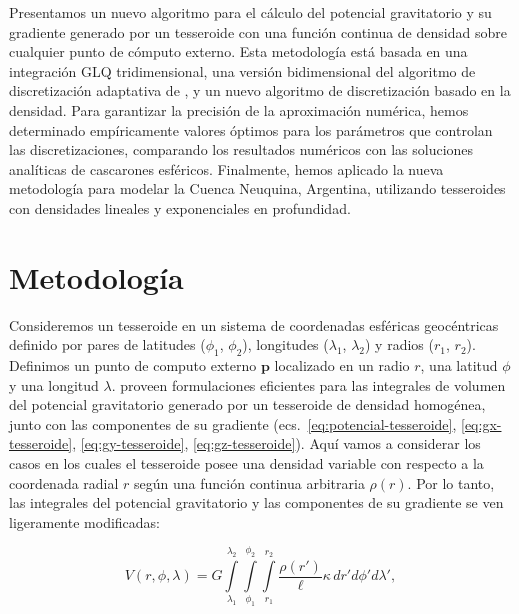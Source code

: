 Presentamos un nuevo algoritmo para el cálculo del potencial gravitatorio y su
gradiente generado por un tesseroide con una función continua de densidad sobre
cualquier punto de cómputo externo.
Esta metodología está basada en una integración \ac{GLQ} tridimensional, una
versión bidimensional del algoritmo de discretización adaptativa de
\citet{uieda2016} \citep[de acuerdo con~][]{lin2019}, y un nuevo algoritmo
de discretización basado en la densidad.
Para garantizar la precisión de la aproximación numérica, hemos determinado
empíricamente valores óptimos para los parámetros que controlan las
discretizaciones, comparando los resultados numéricos con las soluciones
analíticas de cascarones esféricos.
Finalmente, hemos aplicado la nueva metodología para modelar la Cuenca
Neuquina, Argentina, utilizando tesseroides con densidades lineales
y exponenciales en profundidad.


\section{Metodología}

Consideremos un tesseroide en un sistema de coordenadas esféricas geocéntricas
definido por pares de latitudes ($\phi_1$, $\phi_2$), longitudes ($\lambda_1$,
$\lambda_2$) y radios ($r_1$, $r_2$).
Definimos un punto de computo externo $\mathbf{p}$ localizado en un radio $r$,
una latitud $\phi$ y una longitud $\lambda$.
\citet{grombein2013} proveen formulaciones eficientes para las integrales de
volumen del potencial gravitatorio generado por un tesseroide de densidad
homogénea, junto con las componentes de su gradiente
(ecs.~\ref{eq:potencial-tesseroide}, \ref{eq:gx-tesseroide},
\ref{eq:gy-tesseroide}, \ref{eq:gz-tesseroide}).
Aquí vamos a considerar los casos en los cuales el tesseroide posee una
densidad variable con respecto a la coordenada radial $r$ según una función
continua arbitraria $\rho(r)$.
Por lo tanto, las integrales del potencial gravitatorio y las componentes de su
gradiente se ven ligeramente modificadas:

\begin{equation}
    V(r,\phi,\lambda) = G
    \int\limits_{\lambda_1}^{\lambda_2}
    \int\limits_{\phi_1}^{\phi_2}
    \int\limits_{r_1}^{r_2}
    \frac{\rho(r')}{\ell} \kappa \,  dr' d\phi' d\lambda',
\label{eq:tesseroid-pot}
\end{equation}

